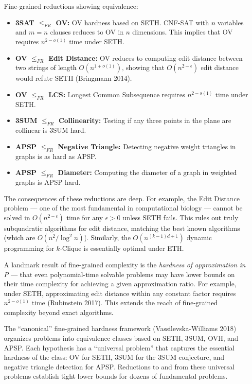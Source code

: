 Fine-grained reductions showing equivalence:
\begin{itemize}
\item \textbf{3SAT $\le_{FR}$ OV:} OV hardness based on SETH. CNF-SAT with $n$ variables and $m = n$ clauses reduces to OV in $n$ dimensions. This implies that OV requires $n^{2-o(1)}$ time under SETH.
\item \textbf{OV $\le_{FR}$ Edit Distance:} OV reduces to computing edit distance between two strings of length $O(n^{1+o(1)})$, showing that $O(n^{2-\epsilon})$ edit distance would refute SETH (Bringmann 2014).
\item \textbf{OV $\le_{FR}$ LCS:} Longest Common Subsequence requires $n^{2-o(1)}$ time under SETH.
\item \textbf{3SUM $\le_{FR}$ Collinearity:} Testing if any three points in the plane are collinear is 3SUM-hard.
\item \textbf{APSP $\le_{FR}$ Negative Triangle:} Detecting negative weight triangles in graphs is as hard as APSP.
\item \textbf{APSP $\le_{FR}$ Diameter:} Computing the diameter of a graph in weighted graphs is APSP-hard.
\end{itemize}

The consequences of these reductions are deep. For example, the Edit Distance problem — one of the most fundamental in computational biology — cannot be solved in $O(n^{2-\epsilon})$ time for any $\epsilon > 0$ unless SETH fails. This rules out truly subquadratic algorithms for edit distance, matching the best known algorithms (which are $O(n^2/\log^2 n)$). Similarly, the $O(n^{(k-1)d+1})$ dynamic programming for $k$-Clique is essentially optimal under ETH.

A landmark result of fine-grained complexity is the \emph{hardness of approximation in P} — that even polynomial-time solvable problems may have lower bounds on their time complexity for achieving a given approximation ratio. For example, under SETH, approximating edit distance within any constant factor requires $n^{2-o(1)}$ time (Rubinstein 2017). This extends the reach of fine-grained complexity beyond exact algorithms.

The ``canonical'' fine-grained hardness framework (Vassilevska-Williams 2018) organizes problems into equivalence classes based on SETH, 3SUM, OVH, and APSP. Each hypothesis has a ``universal problem'' that captures the essential hardness of the class: OV for SETH, 3SUM for the 3SUM conjecture, and negative triangle detection for APSP. Reductions to and from these universal problems establish tight lower bounds for dozens of fundamental problems.

